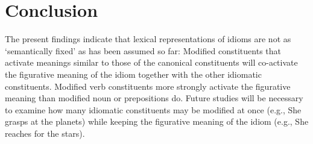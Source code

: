 \documentclass[output=paper]{langsci/langscibook}
\begin{document}
\section{Conclusion}
The present findings indicate that lexical representations of idioms are not as ‘semantically fixed’ as has been assumed so far: Modified constituents that activate meanings similar to those of the canonical constituents will co-activate the figurative meaning of the idiom together with the other idiomatic constituents. Modified verb constituents more strongly activate the figurative meaning than modified noun or prepositions do. Future studies will be necessary to examine how many idiomatic constituents may be modified at once (e.g., She grasps at the planets) while keeping the figurative meaning of the idiom (e.g., She reaches for the stars).



{\sloppy
\printbibliography[heading=subbibliography,notkeyword=this]
}
\end{document}
